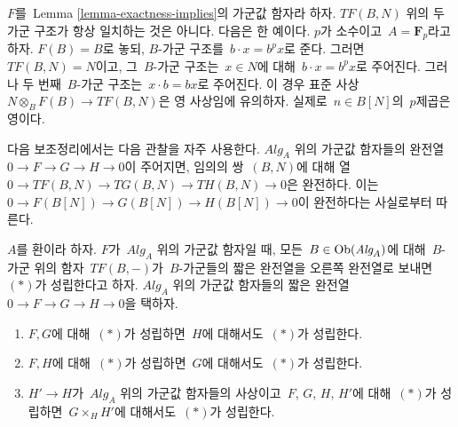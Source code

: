 \begin{example}
\label{example-module-structure-different}
$F$를\  Lemma \ref{lemma-exactness-implies}의 가군값 함자라 하자.
$TF(B, N)$ 위의 두 가군 구조가 항상 일치하는 것은 아니다.
다음은 한 예이다. $p$가 소수이고\  $A = \mathbf{F}_p$라고 하자.
$F(B) = B$로 놓되, $B$-가군 구조를\  $b \cdot x = b^px$로 준다.
그러면\  $TF(B, N) = N$이고, 그\  $B$-가군 구조는\  $x \in N$에 대해\ 
$b \cdot x = b^px$로 주어진다. 그러나 두 번째\  $B$-가군 구조는\ 
$x \cdot b = bx$로 주어진다. 이 경우 표준 사상\ 
$N \otimes_B F(B) \to TF(B, N)$은 영 사상임에 유의하자. 실제로\ 
$n \in B[N]$의\  $p$제곱은 영이다.
\end{example}

\noindent
다음 보조정리에서는 다음 관찰을 자주 사용한다.
$\textit{Alg}_A$ 위의 가군값 함자들의 완전열\ 
$0 \to F \to G \to H \to 0$이 주어지면, 임의의 쌍\  $(B, N)$에
대해 열\  $0 \to TF(B, N) \to TG(B, N) \to TH(B, N) \to 0$은
완전하다. 이는\  $0 \to F(B[N]) \to G(B[N]) \to H(B[N]) \to 0$이
완전하다는 사실로부터 따른다.

\begin{lemma}
\label{lemma-exactness-permanence}
$A$를 환이라 하자. $F$가\  $\textit{Alg}_A$ 위의 가군값 함자일 때,
모든\  $B \in \mathop{\mathrm{Ob}}\nolimits(\textit{Alg}_A)$에 대해\  $B$-가군 위의 함자\ 
$TF(B, -)$가\  $B$-가군들의 짧은 완전열을 오른쪽 완전열로 보내면\ 
$(*)$가 성립한다고 하자. $\textit{Alg}_A$ 위의 가군값 함자들의
짧은 완전열\  $0 \to F \to G \to H \to 0$을 택하자.
\begin{enumerate}
\item $F, G$에 대해\  $(*)$가 성립하면\  $H$에 대해서도\  $(*)$가 성립한다.
\item $F, H$에 대해\  $(*)$가 성립하면\  $G$에 대해서도\  $(*)$가 성립한다.
\item $H' \to H$가\  $\textit{Alg}_A$ 위의 가군값 함자들의 사상이고\ 
$F$, $G$, $H$, $H'$에 대해\  $(*)$가 성립하면\ 
$G \times_H H'$에 대해서도\  $(*)$가 성립한다.
\end{enumerate}
\end{lemma}

